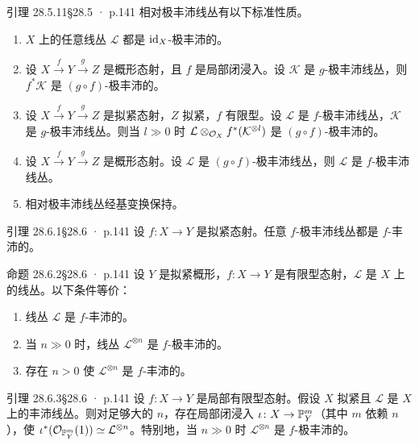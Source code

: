 \documentclass[UTF8,10pt,fontset=windows]{ctexart}
\newcommand{\cK}{\mathcal{K}}\newcommand{\cL}{\mathcal{L}}\newcommand{\cM}{\mathcal{M}}
\begin{document}
\begin{card}{引理 28.5.11}{§28.5 · p.141}
相对极丰沛线丛有以下标准性质。
\begin{enumerate}[label=(\arabic*),leftmargin=2.6em,itemsep=0.35ex]
  \item $X$ 上的任意线丛 $\cL$ 都是 $\operatorname{id}_X$-极丰沛的。
  \item 设 $X\xrightarrow{f}Y\xrightarrow{g}Z$ 是概形态射，且 $f$ 是局部闭浸入。设 $\cK$ 是 $g$-极丰沛线丛，则 $f^*\cK$ 是 $(g\circ f)$-极丰沛的。
  \item[\textup{(2')}] 设 $X\xrightarrow{f}Y\xrightarrow{g}Z$ 是拟紧态射，$Z$ 拟紧，$f$ 有限型。设 $\cL$ 是 $f$-极丰沛线丛，$\cK$ 是 $g$-极丰沛线丛。则当 $l\gg 0$ 时 $\cL\otimes_{\cO_X}f^*(\cK^{\otimes l})$ 是 $(g\circ f)$-极丰沛的。
  \item 设 $X\xrightarrow{f}Y\xrightarrow{g}Z$ 是概形态射。设 $\cL$ 是 $(g\circ f)$-极丰沛线丛，则 $\cL$ 是 $f$-极丰沛线丛。
  \item 相对极丰沛线丛经基变换保持。
\end{enumerate}
\end{card}
\begin{card}{引理 28.6.1}{§28.6 · p.141}
设 $f\colon X\to Y$ 是拟紧态射。任意 $f$-极丰沛线丛都是 $f$-丰沛的。
\end{card}
\begin{card}{命题 28.6.2}{§28.6 · p.141}
设 $Y$ 是拟紧概形，$f\colon X\to Y$ 是有限型态射，$\cL$ 是 $X$ 上的线丛。以下条件等价：
\begin{enumerate}[label=(\roman*),leftmargin=2.6em,itemsep=0.3ex]
  \item 线丛 $\cL$ 是 $f$-丰沛的。
  \item 当 $n\gg 0$ 时，线丛 $\cL^{\otimes n}$ 是 $f$-极丰沛的。
  \item 存在 $n>0$ 使 $\cL^{\otimes n}$ 是 $f$-丰沛的。
\end{enumerate}
\end{card}
\begin{card}{引理 28.6.3}{§28.6 · p.141}
设 $f\colon X\to Y$ 是局部有限型态射。假设 $X$ 拟紧且 $\cL$ 是 $X$ 上的丰沛线丛。则对足够大的 $n$，存在局部闭浸入 $\iota\colon X\to\mathbb{P}^m_Y$（其中 $m$ 依赖 $n$），使 $\iota^*(\cO_{\PP^m_Y}(1))\simeq\cL^{\otimes n}$。特别地，当 $n\gg 0$ 时 $\cL^{\otimes n}$ 是 $f$-极丰沛的。
\end{card}
\end{document}
